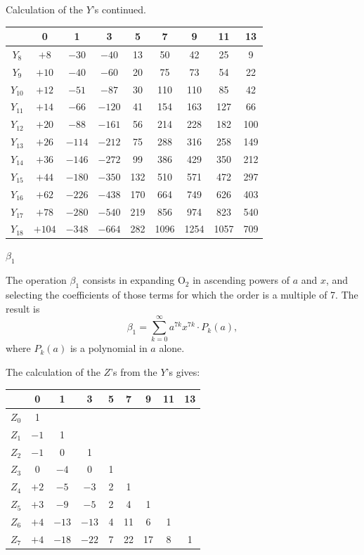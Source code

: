 \documentclass[11pt,a4paper]{article}
\begin{document}
\clearpage
Calculation of the $Y$'s continued.

\begin{center}
\begin{tabular}{c|cccccccc}
& 0 & 1 & 3 & 5 & 7 & 9 & 11 & 13 \\
\hline
$Y_8$ & $+8$ & $-30$ & $-40$ & 13 & 50 & 42 & 25 & 9 \\
$Y_9$ & $+10$ & $-40$ & $-60$ & 20 & 75 & 73 & 54 & 22 \\
$Y_{10}$ & $+12$ & $-51$ & $-87$ & 30 & 110 & 110 & 85 & 42 \\
$Y_{11}$ & $+14$ & $-66$ & $-120$ & 41 & 154 & 163 & 127 & 66 \\
$Y_{12}$ & $+20$ & $-88$ & $-161$ & 56 & 214 & 228 & 182 & 100 \\
$Y_{13}$ & $+26$ & $-114$ & $-212$ & 75 & 288 & 316 & 258 & 149 \\
$Y_{14}$ & $+36$ & $-146$ & $-272$ & 99 & 386 & 429 & 350 & 212 \\
$Y_{15}$ & $+44$ & $-180$ & $-350$ & 132 & 510 & 571 & 472 & 297 \\
$Y_{16}$ & $+62$ & $-226$ & $-438$ & 170 & 664 & 749 & 626 & 403 \\
$Y_{17}$ & $+78$ & $-280$ & $-540$ & 219 & 856 & 974 & 823 & 540 \\
$Y_{18}$ & $+104$ & $-348$ & $-664$ & 282 & 1096 & 1254 & 1057 & 709
\end{tabular}
\end{center}

\clearpage
$\beta_1$

The operation $\beta_1$ consists in expanding $\mathrm{O}_2$ in ascending powers of $a$ and $x$, and selecting the coefficients of those terms for which the order is a multiple of 7. The result is
\[
\beta_1 = \sum_{k=0}^{\infty} a^{7k} x^{7k} \cdot P_k(a),
\]
where $P_k(a)$ is a polynomial in $a$ alone.

The calculation of the $Z$'s from the $Y$'s gives:

\begin{center}
\begin{tabular}{c|cccccccc}
& 0 & 1 & 3 & 5 & 7 & 9 & 11 & 13 \\
\hline
$Z_0$ & 1 & & & & & & & \\
$Z_1$ & $-1$ & 1 & & & & & & \\
$Z_2$ & $-1$ & 0 & 1 & & & & & \\
$Z_3$ & 0 & $-4$ & 0 & 1 & & & & \\
$Z_4$ & $+2$ & $-5$ & $-3$ & 2 & 1 & & & \\
$Z_5$ & $+3$ & $-9$ & $-5$ & 2 & 4 & 1 & & \\
$Z_6$ & $+4$ & $-13$ & $-13$ & 4 & 11 & 6 & 1 & \\
$Z_7$ & $+4$ & $-18$ & $-22$ & 7 & 22 & 17 & 8 & 1
\end{tabular}
\end{center}
\end{document}
